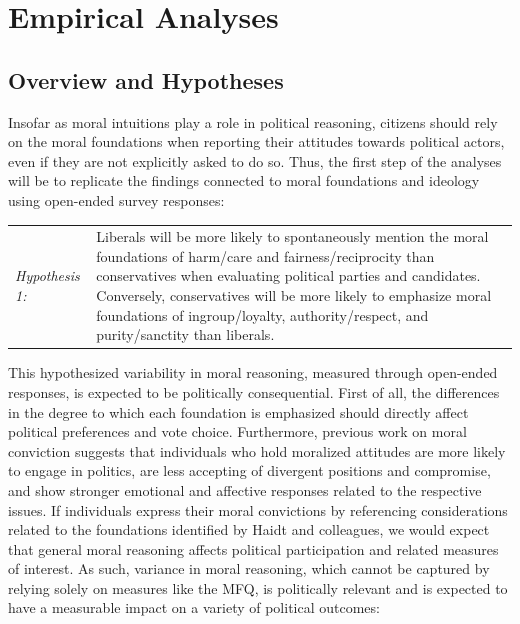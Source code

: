 \documentclass[12pt]{article}
\begin{document}
\section{Empirical Analyses}

\subsection{Overview and Hypotheses}



Insofar as moral intuitions play a role in political reasoning, citizens should rely on the moral foundations when reporting their attitudes towards political actors, even if they are not explicitly asked to do so. Thus, the first step of the analyses will be to replicate the findings connected to moral foundations and ideology using open-ended survey responses:

\vspace{0.3cm}
\begin{tabular}{lp{12cm}}
\textsl{Hypothesis 1:} & Liberals will be more likely to spontaneously mention the moral foundations of harm/care and fairness/reciprocity  than conservatives when evaluating political parties and candidates. Conversely, conservatives will be more likely to emphasize moral foundations of ingroup/loyalty, authority/respect, and purity/sanctity than liberals.
\end{tabular}
\vspace{0.5cm}

This hypothesized variability in moral reasoning, measured through open-ended responses, is expected to be politically consequential. First of all, the differences in the degree to which each foundation is emphasized should directly affect political preferences and vote choice. Furthermore, previous work on moral conviction suggests that individuals who hold moralized attitudes are more likely to engage in politics, are less accepting of divergent positions and compromise, and show stronger emotional and affective responses related to the respective issues. If individuals express their moral convictions by referencing considerations related to the foundations identified by Haidt and colleagues, we would expect that general moral reasoning affects political participation and related measures of interest. As such, variance in moral reasoning, which cannot be captured by relying solely on measures like the MFQ, is politically relevant and is expected to have a measurable impact on a variety of political outcomes:
\end{document}
